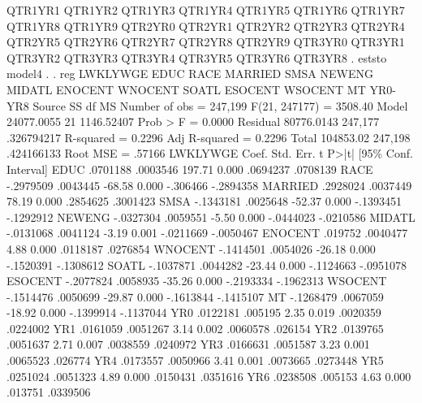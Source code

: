                QTR1YR1 QTR1YR2 QTR1YR3 QTR1YR4 QTR1YR5 QTR1YR6 QTR1YR7
               QTR1YR8 QTR1YR9 QTR2YR0 QTR2YR1 QTR2YR2 QTR2YR3 QTR2YR4
               QTR2YR5 QTR2YR6 QTR2YR7 QTR2YR8 QTR2YR9 QTR3YR0 QTR3YR1
               QTR3YR2 QTR3YR3 QTR3YR4 QTR3YR5 QTR3YR6 QTR3YR8
{\smallskip}
. eststo model4
{\smallskip}
. 
. reg  LWKLYWGE EDUC  RACE MARRIED SMSA NEWENG MIDATL ENOCENT WNOCENT SOATL ESOCENT WSOCENT MT YR0-YR8  
{\smallskip}
      Source {\VBAR}       SS           df       MS      Number of obs   =   247,199
   F(21, 247177)   =   3508.40
       Model {\VBAR}  24077.0055        21  1146.52407   Prob > F        =    0.0000
    Residual {\VBAR}  80776.0143   247,177  .326794217   R-squared       =    0.2296
   Adj R-squared   =    0.2296
       Total {\VBAR}   104853.02   247,198  .424166133   Root MSE        =    .57166
{\smallskip}
    LWKLYWGE {\VBAR}      Coef.   Std. Err.      t    P>|t|     [95\% Conf. Interval]
        EDUC {\VBAR}   .0701188   .0003546   197.71   0.000     .0694237    .0708139
        RACE {\VBAR}  -.2979509   .0043445   -68.58   0.000     -.306466   -.2894358
     MARRIED {\VBAR}   .2928024   .0037449    78.19   0.000     .2854625    .3001423
        SMSA {\VBAR}  -.1343181   .0025648   -52.37   0.000    -.1393451   -.1292912
      NEWENG {\VBAR}  -.0327304   .0059551    -5.50   0.000    -.0444023   -.0210586
      MIDATL {\VBAR}  -.0131068   .0041124    -3.19   0.001    -.0211669   -.0050467
     ENOCENT {\VBAR}    .019752   .0040477     4.88   0.000     .0118187    .0276854
     WNOCENT {\VBAR}  -.1414501   .0054026   -26.18   0.000    -.1520391   -.1308612
       SOATL {\VBAR}  -.1037871   .0044282   -23.44   0.000    -.1124663   -.0951078
     ESOCENT {\VBAR}  -.2077824   .0058935   -35.26   0.000    -.2193334   -.1962313
     WSOCENT {\VBAR}  -.1514476   .0050699   -29.87   0.000    -.1613844   -.1415107
          MT {\VBAR}  -.1268479   .0067059   -18.92   0.000    -.1399914   -.1137044
         YR0 {\VBAR}   .0122181    .005195     2.35   0.019     .0020359    .0224002
         YR1 {\VBAR}   .0161059   .0051267     3.14   0.002     .0060578     .026154
         YR2 {\VBAR}   .0139765   .0051637     2.71   0.007     .0038559    .0240972
         YR3 {\VBAR}   .0166631   .0051587     3.23   0.001     .0065523     .026774
         YR4 {\VBAR}   .0173557   .0050966     3.41   0.001     .0073665    .0273448
         YR5 {\VBAR}   .0251024   .0051323     4.89   0.000     .0150431    .0351616
         YR6 {\VBAR}   .0238508    .005153     4.63   0.000      .013751    .0339506
